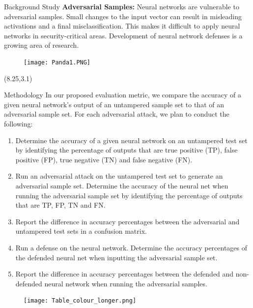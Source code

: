 \documentclass[22pt]{beamer}
\begin{document}
\begin{frame}[fragile]
\begin{textblock}{7.25}
\begin{block}{Background Study}
\textbf{Adversarial Samples:} Neural networks are vulnerable to adversarial samples. Small changes to the input vector can result in misleading activations and a final misclassification. This makes it difficult to apply neural networks in security-critical areas. Development of neural network defenses is a growing area of research. 

\begin{figure}
\texttt{[image: Panda1.PNG]}
\end{figure}

\vspace{5mm} %

\end{block}
\end{textblock}


\begin{textblock}{7.25}(8.25,3.1)
\begin{block}{Methodology}
In our proposed evaluation metric, we compare the accuracy of a given neural network's output of an untampered sample set to that of an adversarial sample set. For each adversarial attack, we plan to conduct the following:
\begin{enumerate}
\item Determine the accuracy of a given neural network on an untampered test set by identifying the percentage of outputs that are true positive (TP), false positive (FP), true negative (TN) and false negative (FN).
\item Run an adversarial attack on the untampered test set to generate an adversarial sample set. Determine the accuracy of the neural net when running the adversarial sample set by identifying the percentage of outputs that are TP, FP, TN and FN.
\item Report the difference in accuracy percentages between the adversarial and untampered test sets in a confusion matrix.
\item Run a defense on the neural network. Determine the accuracy percentages of the defended neural net when inputting the adversarial sample set. 
\item Report the difference in accuracy percentages between the defended and non-defended neural network when running the adversarial samples. 
\end{enumerate}

\begin{figure}
\texttt{[image: Table\_colour\_longer.png]}
\end{figure}


\end{block}
\end{textblock}
\end{frame}
\end{document}
